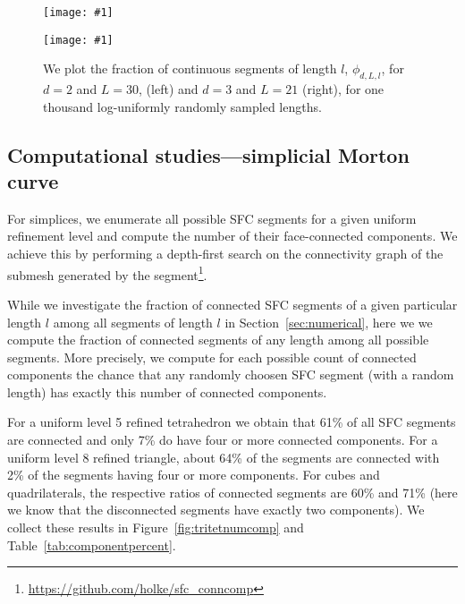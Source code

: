 \documentclass[a4paper,11pt]{article}
\newcommand{\inputtikz}[1]{\texttt{[image: \#1]}}
\newcommand{\figlab}[1]{\label{fig:#1}}
\newcommand{\secref}[1]{Section~\ref{sec:#1}}
\begin{document}
\begin{figure}\centering
  \begin{minipage}{0.49\textwidth}\centering
    \inputtikz{enumerate2d}
  \end{minipage}
  \begin{minipage}{0.49\textwidth}\centering
    \inputtikz{enumerate3d}
  \end{minipage}
  \caption{We plot the fraction of continuous segments of length $l$,
    $\phi_{d,L,l}$, for $d=2$ and $L=30$, (left) and $d=3$ and $L=21$
    (right), for one thousand log-uniformly randomly sampled lengths.
}\figlab{enumerate}
\end{figure}

\subsection{Computational studies---simplicial Morton curve}

For simplices, we enumerate all possible SFC segments for a given uniform
refinement level and compute the number of their face-connected components.
We achieve this by performing a depth-first search on the connectivity
graph of the submesh generated by the segment\footnote{\url{https://github.com/holke/sfc_conncomp}}.

While we investigate the fraction of connected SFC segments of a given
particular length $l$ among all segments of length $l$ in \secref{numerical},
here we we compute the fraction of connected segments of any length among all
possible segments.
More precisely, we compute for each possible count of connected components
the chance that any randomly choosen SFC segment (with a random length) has
exactly this number of connected components.

For a uniform level 5 refined tetrahedron we obtain that 61\% of all
SFC segments are connected and only 7\% do have four or more connected
components.
For a uniform level 8 refined triangle, about 64\% of the segments are connected
with 2\% of the segments having four or more components.
For cubes and quadrilaterals, the respective ratios of connected segments are
60\% and 71\% (here we know that the disconnected segments have exactly two
components).
We collect these results in Figure~\ref{fig:tritetnumcomp} and
Table~\ref{tab:componentpercent}.
\end{document}

